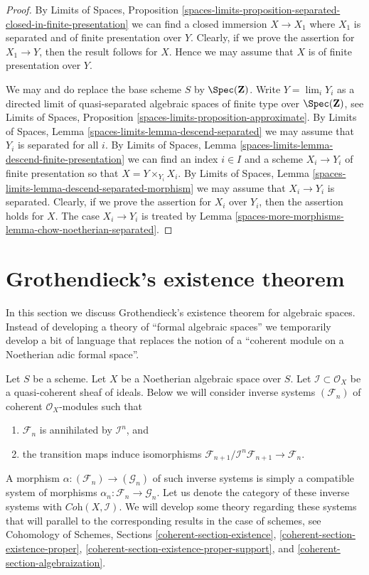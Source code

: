 \begin{proof}
By
Limits of Spaces, Proposition
\ref{spaces-limits-proposition-separated-closed-in-finite-presentation}
we can find a closed immersion $X \to X_1$ where $X_1$ is separated
and of finite presentation over $Y$. Clearly, if we prove the assertion
for $X_1 \to Y$, then the result follows for $X$. Hence we may assume that
$X$ is of finite presentation over $Y$.

\medskip\noindent
We may and do replace the base scheme $S$ by $\Spec(\mathbf{Z})$.
Write $Y = \lim_i Y_i$ as a directed limit of
quasi-separated algebraic spaces of finite type over $\Spec(\mathbf{Z})$, see
Limits of Spaces,
Proposition \ref{spaces-limits-proposition-approximate}.
By Limits of Spaces, Lemma \ref{spaces-limits-lemma-descend-separated}
we may assume that $Y_i$ is separated for all $i$.
By
Limits of Spaces,
Lemma \ref{spaces-limits-lemma-descend-finite-presentation}
we can
find an index $i \in I$ and a scheme $X_i \to Y_i$ of finite presentation
so that $X = Y \times_{Y_i} X_i$.
By
Limits of Spaces,
Lemma \ref{spaces-limits-lemma-descend-separated-morphism}
we may assume that $X_i \to Y_i$ is separated.
Clearly, if we prove the assertion for
$X_i$ over $Y_i$, then the assertion holds for $X$. The case
$X_i \to Y_i$ is treated by
Lemma \ref{spaces-more-morphisms-lemma-chow-noetherian-separated}.
\end{proof}

\section{Grothendieck's existence theorem}
\label{spaces-more-morphisms-section-existence-proper}
In this section we discuss Grothendieck's existence theorem for algebraic
spaces. Instead of developing a theory of ``formal algebraic spaces''
we temporarily develop a bit of language that replaces the notion of a
``coherent module on a Noetherian adic formal space''.

\medskip\noindent
Let $S$ be a scheme. Let $X$ be a Noetherian algebraic space over $S$.
Let $\mathcal{I} \subset \mathcal{O}_X$ be a quasi-coherent sheaf of ideals.
Below we will consider inverse systems $(\mathcal{F}_n)$ of coherent
$\mathcal{O}_X$-modules such that
\begin{enumerate}
\item $\mathcal{F}_n$ is annihilated by $\mathcal{I}^n$, and
\item the transition maps induce isomorphisms
$\mathcal{F}_{n + 1}/\mathcal{I}^n\mathcal{F}_{n + 1} \to \mathcal{F}_n$.
\end{enumerate}
A morphism $\alpha : (\mathcal{F}_n) \to (\mathcal{G}_n)$
of such inverse systems is simply a compatible system of morphisms
$\alpha_n : \mathcal{F}_n \to \mathcal{G}_n$.
Let us denote the category of these inverse systems with
$\textit{Coh}(X, \mathcal{I})$. We will develop some theory regarding
these systems that will parallel to the corresponding
results in the case of schemes, see
Cohomology of Schemes, Sections \ref{coherent-section-existence},
\ref{coherent-section-existence-proper},
\ref{coherent-section-existence-proper-support}, and
\ref{coherent-section-algebraization}.

